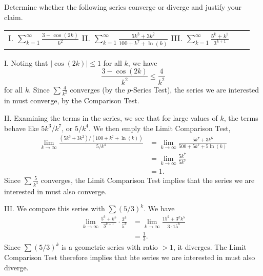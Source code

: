 \documentclass[noauthor]{ximera}
\begin{document}
\begin{problem}
Determine whether the following series converge or diverge and justify your claim.
\begin{center}
\begin{tabular}{lll}
I. $\sum_{k=1}^\infty \frac{3-\cos(2k)}{k^2}$ \hspace{.3in} II. $\sum_{k=1}^\infty \frac{5k^3+3k^2}{100 + k^7 + \ln(k)}$ \hspace{.3in} III. $\sum_{k=1}^\infty \frac{5^k + k^5}{3^{k+1}}$
\end{tabular}
\end{center}

\begin{freeResponse}
I. Noting that $|\cos(2k)| \leq 1$ for all $k$, we have
$$
\frac{3-\cos(2k)}{k^2} \leq \frac{4}{k^2}
$$
for all $k$. Since $\sum \frac{4}{k^2}$ converges (by the $p$-Series Test), the series we are interested in must converge, by the Comparison Test.

II. Examining the terms in the series, we see that for large values of $k$, the terms behave like $5k^3/k^7$, or $5/k^4$. We then emply the Limit Comparison Test,
\begin{align*}
\lim_{k \rightarrow \infty} \frac{(5k^3+3k^2)/(100+k^7+\ln(k))}{5/k^4} &= \lim_{k \rightarrow \infty} \frac{5k^7 + 3k^6}{500+5k^7 + 5\ln(k)} \\
&= \lim_{k \rightarrow \infty}  \frac{5k^7}{5k^7} \\
&= 1.
\end{align*}
Since $\sum \frac{5}{k^4}$ converges, the Limit Comparison Test implies that the series we are interested in must also converge.

III. We compare this series with $\sum (5/3)^k$. We have 
\begin{align*}
\lim_{k \rightarrow \infty} \frac{5^k + k^5}{3^{k+1}} \cdot \frac{3^k}{5^k} &= \lim_{k \rightarrow \infty} \frac{15^k + 3^k k^5}{3 \cdot 15^k} \\
&= \frac{1}{3}.
\end{align*}
Since $\sum (5/3)^k$ is a geometric series with ratio $> 1$, it diverges. The Limit Comparison Test therefore implies that hte series we are interested in must also diverge.
\end{freeResponse}
\end{problem}
\end{document}
